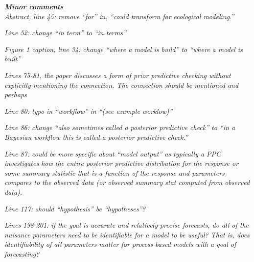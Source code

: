 \documentclass[11pt,letter]{article}
\begin{document}
\begin{mybox}
\emph{\textbf{Minor comments}\\
Abstract, line 45: remove “for” in, “could transform for ecological modeling.”}
\end{mybox}

\begin{mybox}
\emph{Line 52: change “in term” to “in terms”}
\end{mybox}

\begin{mybox}
\emph{Figure 1 caption, line 34: change “where a model is build” to “where a model is built”}
\end{mybox}

\begin{mybox}
\emph{Lines 75-81, the paper discusses a form of prior predictive checking without explicitly mentioning the connection. The connection should be mentioned and perhaps}
\end{mybox}

\begin{mybox}
\emph{Line 80: typo in “workflow” in “(see example worklow)”}
\end{mybox}

\begin{mybox}
\emph{Line 86: change “also sometimes called a posterior predictive check” to “in a Bayesian workflow this is called a posterior predictive check.”}
\end{mybox}

\begin{mybox}
\emph{Line 87: could be more specific about “model output” as typically a PPC investigates how the entire posterior predictive distribution for the response or some summary statistic that is a function of the response and parameters compares to the observed data (or observed summary stat computed from observed data).}
\end{mybox}

\begin{mybox}
\emph{Line 117: should “hypothesis” be “hypotheses”?}
\end{mybox}

\begin{mybox}
\emph{Lines 198-201: if the goal is accurate and relatively-precise forecasts, do all of the nuisance
parameters need to be identifiable for a model to be useful? That is, does identifiability
of all parameters matter for process-based models with a goal of forecasting?}
\end{mybox}


\end{document}
